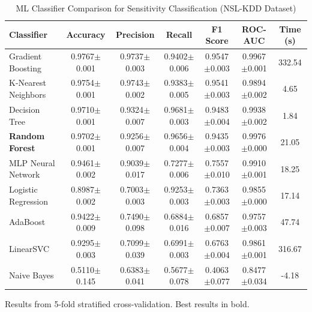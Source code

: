 
\begin{table}[htbp]
\centering
\caption{ML Classifier Comparison for Sensitivity Classification (NSL-KDD Dataset)}
\label{tab:ml_ablation}
\begin{tabular}{lcccccc}
\toprule
\textbf{Classifier} & \textbf{Accuracy} & \textbf{Precision} & \textbf{Recall} & \textbf{F1 Score} & \textbf{ROC-AUC} & \textbf{Time (s)} \\
\midrule
Gradient Boosting & 0.9767$\pm$0.001 & 0.9737$\pm$0.003 & 0.9402$\pm$0.006 & 0.9547$\pm$0.003 & 0.9967$\pm$0.001 & 332.54 \\
K-Nearest Neighbors & 0.9754$\pm$0.001 & 0.9743$\pm$0.002 & 0.9383$\pm$0.005 & 0.9541$\pm$0.003 & 0.9894$\pm$0.002 & 4.65 \\
Decision Tree & 0.9710$\pm$0.001 & 0.9324$\pm$0.007 & 0.9681$\pm$0.003 & 0.9483$\pm$0.004 & 0.9938$\pm$0.002 & 1.84 \\
\textbf{Random Forest} & 0.9702$\pm$0.001 & 0.9256$\pm$0.007 & 0.9656$\pm$0.004 & 0.9435$\pm$0.003 & 0.9976$\pm$0.000 & 21.05 \\
MLP Neural Network & 0.9461$\pm$0.002 & 0.9039$\pm$0.017 & 0.7277$\pm$0.006 & 0.7557$\pm$0.010 & 0.9910$\pm$0.001 & 18.25 \\
Logistic Regression & 0.8987$\pm$0.002 & 0.7003$\pm$0.003 & 0.9253$\pm$0.003 & 0.7363$\pm$0.003 & 0.9855$\pm$0.000 & 17.14 \\
AdaBoost & 0.9422$\pm$0.009 & 0.7490$\pm$0.098 & 0.6884$\pm$0.016 & 0.6857$\pm$0.007 & 0.9757$\pm$0.003 & 47.74 \\
LinearSVC & 0.9295$\pm$0.003 & 0.7099$\pm$0.039 & 0.6991$\pm$0.003 & 0.6763$\pm$0.004 & 0.9861$\pm$0.001 & 316.67 \\
Naive Bayes & 0.5110$\pm$0.145 & 0.6383$\pm$0.041 & 0.5677$\pm$0.078 & 0.4063$\pm$0.077 & 0.8477$\pm$0.034 & -4.18 \\
\bottomrule
\end{tabular}
\begin{tablenotes}
\small
\item Results from 5-fold stratified cross-validation. Best results in bold.
\end{tablenotes}
\end{table}
